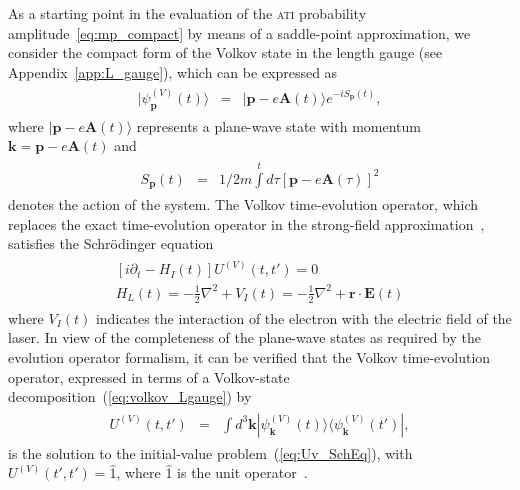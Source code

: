 As a starting point in the evaluation of the \textsc{ati} probability
amplitude~\ref{eq:mp_compact} by means of a saddle-point
approximation, we consider the compact form of the Volkov state in the
length gauge (see Appendix~\ref{app:L_gauge}), which can be expressed
as~\cite{Becker_ati2002}
%
\begin{eqnarray}
\label{eq:volkov_Lgauge}
\begin{split}
|\psi_{\mathbf{p}}^{(V)}(t)\rangle & = &
|\mathbf{p} - e\mathbf{A}(t)\rangle e^{-i S_{\mathbf{p}}(t)},
\end{split}
\end{eqnarray}
%
where $|\mathbf{p} - e\mathbf{A}(t)\rangle$ represents a plane-wave
state with momentum $\mathbf{k} = \mathbf{p} - e\mathbf{A}(t)$ and
%
\begin{eqnarray}
  \begin{split}
    S_{\mathbf{p}}(t) & = & 1/2m \int\limits^{t} d\tau
    [\mathbf{p} - e \mathbf{A}(\tau)]^{2}
  \end{split}
  \label{eq:action_system}
\end{eqnarray}
%
denotes the action of the system. The Volkov time-evolution operator,
which replaces the exact time-evolution operator in the strong-field
approximation~\cite{KeldyshSFA}, satisfies the Schr\"{o}dinger
equation
%
\begin{eqnarray}
  \label{eq:Uv_SchEq}
  \begin{split}
    [ i\partial_{t} - H_{I}(t) ] U^{(V)}(t,t') = 0 \\
    H_{L}(t) = -\frac{1}{2} \nabla^{2} + V_{I}(t) =
    -\frac{1}{2} \nabla^{2} + \mathbf{r} \cdot \mathbf{E}(t)
  \end{split}
\end{eqnarray}
%
where $V_{I}(t)$ indicates the interaction of the electron with the
electric field of the laser. In view of the completeness of the
plane-wave states as required by the evolution operator formalism, it
can be verified that the Volkov time-evolution operator, expressed in
terms of a Volkov-state decomposition~(\ref{eq:volkov_Lgauge}) by
%
\begin{eqnarray}
\label{eq:te_volkov}
\begin{split}
U^{(V)}(t,t') & = & \int d^{3}\mathbf{k}
|\psi_{\mathbf{k}}^{(V)}(t) \rangle
\langle \psi_{\mathbf{k}}^{(V)}(t')|,
\end{split}
\end{eqnarray}
%
is the solution to the initial-value problem~(\ref{eq:Uv_SchEq}), with
$U^{(V)}(t',t') = \hat{1}$, where $\hat{1}$ is the unit
operator~\cite{BeckerTEOp_2006,cjp2010_keldysh}.

